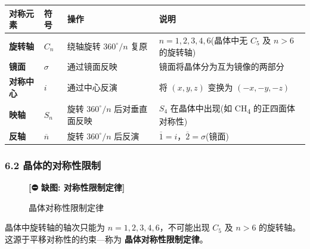 \documentclass[a4paper,11pt]{ctexart}
\newcounter{none}
\newcommand{\箭}{\ensuremath{\rightarrow}}
\newcommand{\左箭}{\ensuremath{\leftarrow}}
\newcommand{\上箭}{\ensuremath{\uparrow}}
\newcommand{\下箭}{\ensuremath{\downarrow}}
\newcommand{\衡}{\ensuremath{\rightleftharpoons}}
\newcommand{\双箭}{\ensuremath{\leftrightarrow}}
\newcommand{\约等于}{\ensuremath{\approx}}
\newcommand{\小于等于}{\ensuremath{\leq}}
\newcommand{\大于等于}{\ensuremath{\geq}}
\newcommand{\不等于}{\ensuremath{\neq}}
\newcommand{\西格马}{\ensuremath{\sigma}}
\newcommand{\派}{\ensuremath{\pi}}
\begin{document}
{\def\LTcaptype{none} %
\begin{longtable}[]{@{}
  >{\centering\arraybackslash}p{}
  >{\centering\arraybackslash}p{}
  >{\raggedright\arraybackslash}p{}
  >{\raggedright\arraybackslash}p{}@{}}
\toprule\noalign{}
\begin{minipage}[b]{\linewidth}\centering
对称元素
\end{minipage} & \begin{minipage}[b]{\linewidth}\centering
符号
\end{minipage} & \begin{minipage}[b]{\linewidth}\raggedright
操作
\end{minipage} & \begin{minipage}[b]{\linewidth}\raggedright
说明
\end{minipage} \\
\midrule\noalign{}
\endhead
\bottomrule\noalign{}
\endlastfoot
\textbf{旋转轴} & \(C_n\) & 绕轴旋转 \(360^\circ/n\) 复原 & \(n = 1, 2, 3, 4, 6\)(晶体中无 \(C_5\) 及 \(n > 6\) 的旋转轴) \\
\textbf{镜面} & \(\sigma\) & 通过镜面反映 & 镜面将晶体分为互为镜像的两部分 \\
\textbf{对称中心} & \(i\) & 通过中心反演 & 将 \((x, y, z)\) 变换为 \((-x, -y, -z)\) \\
\textbf{映轴} & \(S_n\) & 旋转 \(360^\circ/n\) 后对垂直面反映 & \(S_4\) 在晶体中出现(如 CH\textsubscript{4} 的正四面体对称性) \\
\textbf{反轴} & \(\overline{n}\) & 旋转 \(360^\circ/n\) 后反演 & \(\overline{1} = i\)，\(\overline{2} = \sigma\)(镜面) \\
\end{longtable}
}

\subsubsection{6.2 晶体的对称性限制}\label{ux6676ux4f53ux7684ux5bf9ux79f0ux6027ux9650ux5236}

\begin{figure}[H]\centering
\textbf{[⛔ 缺图: 对称性限制定律]}
\caption{晶体对称性限制定律}
\end{figure}

晶体中旋转轴的轴次只能为 \(n = 1, 2, 3, 4, 6\)，不可能出现 \(C_5\) 及 \(n > 6\) 的旋转轴。这源于平移对称性的约束---称为 \textbf{晶体对称性限制定律}。
\end{document}
